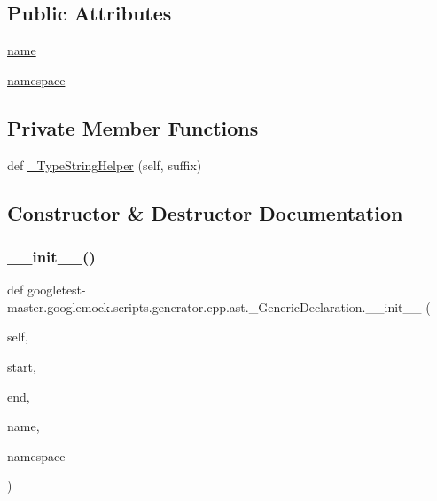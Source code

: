 \subsection*{Public Attributes}
\begin{DoxyCompactItemize}
\item 
\mbox{\hyperlink{classgoogletest-master_1_1googlemock_1_1scripts_1_1generator_1_1cpp_1_1ast_1_1___generic_declaration_a85dc1c6f0115301c310cd3f99416fa86}{name}}
\item 
\mbox{\hyperlink{classgoogletest-master_1_1googlemock_1_1scripts_1_1generator_1_1cpp_1_1ast_1_1___generic_declaration_a285067decd742f4effc0d1bc674bce85}{namespace}}
\end{DoxyCompactItemize}
\subsection*{Private Member Functions}
\begin{DoxyCompactItemize}
\item 
def \mbox{\hyperlink{classgoogletest-master_1_1googlemock_1_1scripts_1_1generator_1_1cpp_1_1ast_1_1___generic_declaration_a69f935a47760cb75c810239a1630aa84}{\+\_\+\+Type\+String\+Helper}} (self, suffix)
\end{DoxyCompactItemize}


\subsection{Constructor \& Destructor Documentation}
\mbox{\label{classgoogletest-master_1_1googlemock_1_1scripts_1_1generator_1_1cpp_1_1ast_1_1___generic_declaration_ae630aa65920ee0001bfd057ffa9e460c}} 
\subsubsection{\texorpdfstring{\_\_init\_\_()}{\_\_init\_\_()}}
{\footnotesize\ttfamily def googletest-\/master.\+googlemock.\+scripts.\+generator.\+cpp.\+ast.\+\_\+\+Generic\+Declaration.\+\_\+\+\_\+init\+\_\+\+\_\+ (\begin{DoxyParamCaption}\item[{}]{self,  }\item[{}]{start,  }\item[{}]{end,  }\item[{}]{name,  }\item[{}]{namespace }\end{DoxyParamCaption})}



